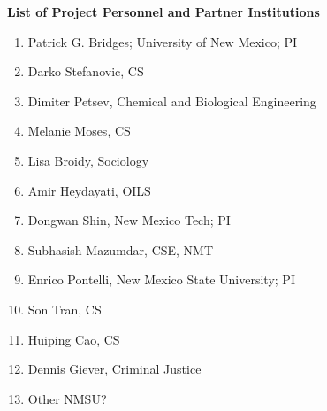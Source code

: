 \documentclass[11pt]{article}
\begin{document}
\begin{center}
{\Large\sc\bf List of Project Personnel and Partner Institutions}
\end{center}

\begin{enumerate}
\item Patrick G. Bridges; University of New Mexico; PI
\item Darko Stefanovic, CS
\item Dimiter Petsev, Chemical and Biological Engineering
\item Melanie Moses, CS
\item Lisa Broidy, Sociology
\item Amir Heydayati, OILS
\item Dongwan Shin, New Mexico Tech; PI
\item Subhasish Mazumdar, CSE, NMT
\item Enrico Pontelli, New Mexico State University; PI
\item Son Tran, CS
\item Huiping Cao, CS
\item Dennis Giever, Criminal Justice
\item  Other NMSU?
\end{enumerate}
\end{document}

